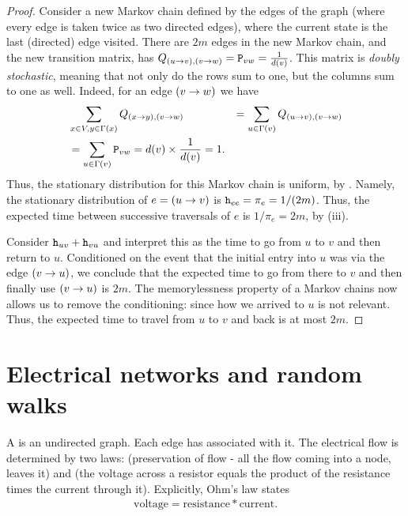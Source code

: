 \begin{proof}
    Consider a new Markov chain defined by the edges of the graph
    (where every edge is taken twice as two directed edges), where the
    current state is the last (directed) edge visited. There are $2m$
    edges in the new Markov chain, and the new transition matrix, has
    $Q_{\left({{u} \rightarrow {v}} \right), \left({{v} \rightarrow {w}} \right) } = \mathtt{P}_{vw} =
    \frac{1}{d(v)}$. This matrix is \emph{doubly stochastic}, meaning
    that not only do the rows sum to one, but the columns sum to one
    as well.  Indeed, for an edge $\left({{v} \rightarrow {w}} \right)$ we have
    \begin{align*}
      &\sum_{x \in V, y \in \Gamma(x)} Q_{\left({{x} \rightarrow {y}} \right),
      \left({{v} \rightarrow {w}} \right)} &= \sum_{u \in \Gamma(v)} Q_{\left({{u} \rightarrow {v}} \right),
      \left({{v} \rightarrow {w}} \right)} \\&= \sum_{u \in \Gamma(v)} \mathtt{P}_{vw} = d(v)
      \times \frac{1}{d(v)} = 1.
    \end{align*}
    Thus, the stationary distribution for this Markov chain is
    uniform, by . Namely, the stationary distribution
    of $e =\left({{u} \rightarrow {v}} \right)$ is $\mathtt{h}_{ee} = \pi_e = 1/(2m)$.
    Thus, the expected time between successive traversals of $e$ is
    $1/\pi_e = 2m$, by  (iii).
    
    Consider $\mathtt{h}_{uv} + \mathtt{h}_{vu}$ and interpret this
    as the time to go from $u$ to $v$ and then return to $u$.
    Conditioned on the event that the initial entry into $u$ was via
    the edge $\left({{v} \rightarrow {u}} \right)$, we conclude that the expected time to
    go from there to $v$ and then finally use $\left({{v} \rightarrow {u}} \right)$ is
    $2m$. The memorylessness property of a Markov chains now allows us
    to remove the conditioning: since how we arrived to $u$ is not
    relevant.  Thus, the expected time to travel from $u$ to $v$ and
    back is at most $2m$.
\end{proof}


\section{Electrical networks and random walks}

A  is an
undirected graph. Each edge has 
associated with it. The electrical flow is determined by two laws:
 (preservation of flow - all the flow coming
into a node, leaves it) and  (the voltage across a
resistor equals the product of the resistance times the current
through it). Explicitly, Ohm's law states
\begin{align*}
    \mathrm{voltage} = \mathrm{resistance} * \mathrm{current}.
\end{align*}



